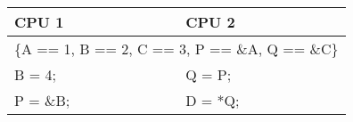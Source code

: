 \centering
\small
\renewcommand{\arraystretch}{1.5}
\begin{tabular}{|p{4cm}|p{4cm}|}
        \hline \textbf{CPU 1}& \textbf{CPU 2}\\[5pt]
	\hline \multicolumn{2}{|c|}{ \{A == 1, B == 2, C == 3, P == \&A, Q == \&C\} }\\	
        \hline B = 4; & Q = P;\\
        \hline P = \&B; & D = *Q;\\
        \hline
\end{tabular}
